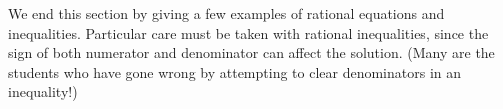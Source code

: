 {\begin{enumerate}
\end{enumerate}
\enlargethispage{\baselineskip}}
\pagebreak




We end this section by giving a few examples of rational equations and inequalities. Particular care must be taken with rational inequalities, since the sign of both numerator and denominator can affect the solution. (Many are the students who have gone wrong by attempting to clear denominators in an inequality!)

\medskip


